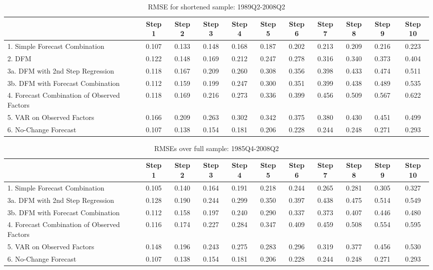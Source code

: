 \documentclass[11pt]{article}
\begin{document}
\newpage
{\normalsize \clearpage
\begin{table}
\center
\caption{RMSE for shortened sample: 1989Q2-2008Q2}
\begin{tabular}{|l|c|c|c|c|c|c|c|c|c|c|}
\hline
&Step 1 &Step 2 &Step 3 &Step 4 &Step 5 &Step 6 &Step 7 &Step 8 &Step 9 &Step 10\\
\hline
1. Simple Forecast Combination             &0.107&0.133&0.148&0.168&0.187&0.202&0.213&0.209&0.216&0.223\\
2. DFM                                     &0.122&0.148&0.169&0.212&0.247&0.278&0.316&0.340&0.373&0.404\\
3a. DFM with 2nd Step Regression           &0.118&0.167&0.209&0.260&0.308&0.356&0.398&0.433&0.474&0.511\\
3b. DFM with Forecast Combination          &0.112&0.159&0.199&0.247&0.300&0.351&0.399&0.438&0.489&0.535\\
4. Forecast Combination of Observed Factors&0.118&0.169&0.216&0.273&0.336&0.399&0.456&0.509&0.567&0.622\\
5. VAR on Observed Factors                 &0.166&0.209&0.263&0.302&0.342&0.375&0.380&0.430&0.451&0.499\\
6. No-Change Forecast                      &0.107&0.138&0.154&0.181&0.206&0.228&0.244&0.248&0.271&0.293\\
\hline
\end{tabular}
\end{table}
}

\newpage
{\normalsize \clearpage
\begin{table}
\caption{RMSEs over full sample: 1985Q4-2008Q2}
\center
\begin{tabular}{|l|c|c|c|c|c|c|c|c|c|c|}
\hline
&Step 1 &Step 2 &Step 3 &Step 4 &Step 5 &Step 6 &Step 7 &Step 8 &Step 9 &Step 10\\
\hline
1. Simple Forecast Combination             &0.105&0.140&0.164&0.191&0.218&0.244&0.265&0.281&0.305&0.327\\
3a. DFM with 2nd Step Regression           &0.128&0.190&0.244&0.299&0.350&0.397&0.438&0.475&0.514&0.549\\
3b. DFM with Forecast Combination          &0.112&0.158&0.197&0.240&0.290&0.337&0.373&0.407&0.446&0.480\\
4. Forecast Combination of Observed Factors&0.116&0.174&0.227&0.284&0.347&0.409&0.459&0.508&0.554&0.595\\
5. VAR on Observed Factors                 &0.148&0.196&0.243&0.275&0.283&0.296&0.319&0.377&0.456&0.530\\
6. No-Change Forecast                      &0.107&0.138&0.154&0.181&0.206&0.228&0.244&0.248&0.271&0.293\\
\hline
\end{tabular}
\end{table}
}
\end{document}
